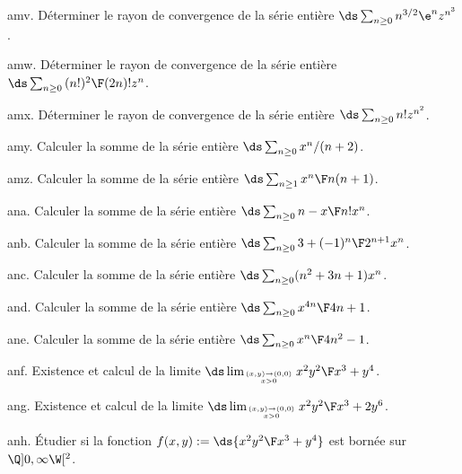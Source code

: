 \exo [Level=2,Fight=0,Learn=0,Field=\SériesEntières,Type=\Exercices,Origin=] amv. 
Déterminer le rayon de convergence de la  série entière $\ds\sum_{n\ge0}n^{3/2}\e^nz^{n^3}$.

\exo [Level=2,Fight=0,Learn=0,Field=\SériesEntières,Type=\Exercices,Origin=] amw. 
Déterminer le rayon de convergence de la  série entière $\ds\sum_{n\ge0}{(n!)^2\F(2n)!}z^n$.

\exo [Level=2,Fight=0,Learn=0,Field=\SériesEntières,Type=\Exercices,Origin=] amx. 
Déterminer le rayon de convergence de la  série entière $\ds\sum_{n\ge0}n!z^{n^2}$. 

\exo [Level=2,Fight=1,Learn=0,Field=\SériesEntières,Type=\Exercices,Origin=] amy. 
Calculer la somme de la série entière $\ds\sum_{n\ge0}x^n/(n+2)$.

\exo [Level=2,Fight=1,Learn=0,Field=\SériesEntières,Type=\Exercices,Origin=] amz. 
Calculer la somme de la série entière $\ds\sum_{n\ge1}{x^n\F n(n+1)}$.

\exo [Level=2,Fight=1,Learn=0,Field=\SériesEntières,Type=\Exercices,Origin=] ana. 
Calculer la somme de la série entière $\ds\sum_{n\ge0}{n-x\F n!}x^n$.

\exo [Level=2,Fight=1,Learn=0,Field=\SériesEntières,Type=\Exercices,Origin=] anb. 
Calculer la somme de la série entière $\ds\sum_{n\ge0}{3+(-1)^n\F 2^{n+1}}x^n$.

\exo [Level=2,Fight=1,Learn=0,Field=\SériesEntières,Type=\Exercices,Origin=] anc. 
Calculer la somme de la série entière $\ds\sum_{n\ge0}(n^2+3n+1)x^n$.

\exo [Level=2,Fight=1,Learn=0,Field=\SériesEntières,Type=\Exercices,Origin=] and. 
Calculer la somme de la série entière $\ds\sum_{n\ge0}{x^{4n}\F 4n+1}$.

\exo [Level=2,Fight=1,Learn=0,Field=\SériesEntières,Type=\Exercices,Origin=] ane. 
Calculer la somme de la série entière $\ds\sum_{n\ge0}{x^n\F4n^2-1}$. 

\exo [Level=2,Fight=2,Learn=2,Field=\FonctionsDePlusieursVariables,Type=\TravauxDirigés,Origin=] anf. 
Existence et calcul de la limite $\ds \lim_{(x,y)\to(0,0)\atop x>0}{x^2y^2\F x^3+y^4}$.

\exo [Level=2,Fight=2,Learn=2,Field=\FonctionsDePlusieursVariables,Type=\TravauxDirigés,Origin=] ang. 
Existence et calcul de la limite $\ds \lim_{(x,y)\to(0,0)\atop x>0}{x^2y^2\F x^3+2y^6}$. 

\exo [Level=2,Fight=2,Learn=2,Field=\FonctionsDePlusieursVariables,Type=\TravauxDirigés,Origin=] anh. 
Étudier si la fonction  $f(x,y):=\ds{x^2y^2\F x^3+y^4}$ est bornée sur $\Q]0,\infty\W[^2$.
 
